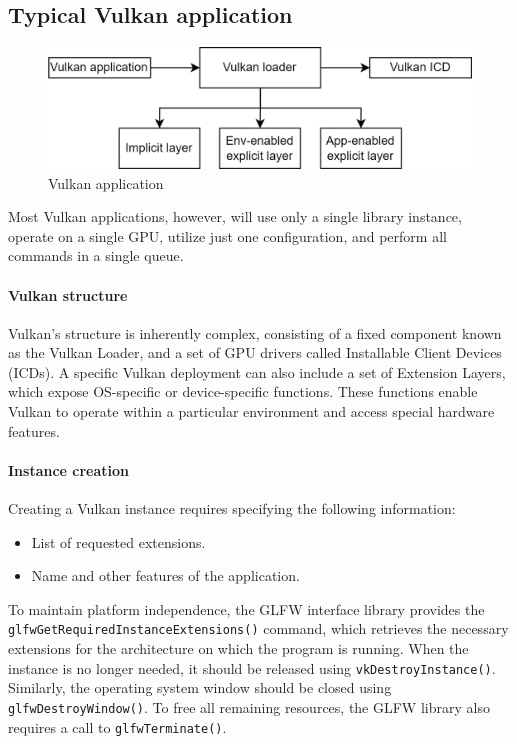 \subsection{Typical Vulkan application}
\begin{figure}[H]
    \centering
    \includegraphics[width=0.4\linewidth]{images/vulkan1.png}
    \caption{Vulkan application}
\end{figure}
Most Vulkan applications, however, will use only a single library instance, operate on a single GPU, utilize just one configuration, and perform all commands in a single queue.

\paragraph*{Vulkan structure}
Vulkan's structure is inherently complex, consisting of a fixed component known as the Vulkan Loader, and a set of GPU drivers called Installable Client Devices (ICDs). 
A specific Vulkan deployment can also include a set of Extension Layers, which expose OS-specific or device-specific functions. 
These functions enable Vulkan to operate within a particular environment and access special hardware features.

\paragraph*{Instance creation}
Creating a Vulkan instance requires specifying the following information:
\begin{itemize}
    \item List of requested extensions.
    \item Name and other features of the application.
\end{itemize}
To maintain platform independence, the GLFW interface library provides the \\\texttt{glfwGetRequiredInstanceExtensions()} command, which retrieves the necessary extensions for the architecture on which the program is running.
When the instance is no longer needed, it should be released using \texttt{vkDestroyInstance()}. 
Similarly, the operating system window should be closed using \texttt{glfwDestroyWindow()}. 
To free all remaining resources, the GLFW library also requires a call to \texttt{glfwTerminate()}.

